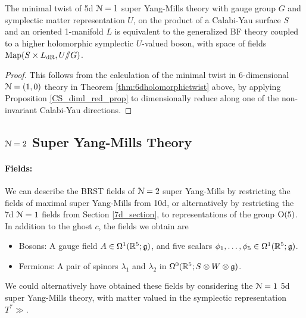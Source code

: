 \documentclass[10pt, oneside]{article}
\newcommand{\ham}{/\!\!/}
\begin{document}
\begin{theorem} \label{5d_holo_twist_theorem}
The minimal twist of 5d $\mathcal{N}=1$ super Yang-Mills theory with gauge group $G$ and symplectic matter representation $U$, on the product of a Calabi-Yau surface $S$ and an oriented 1-manifold $L$ is equivalent to the generalized BF theory coupled to a higher holomorphic symplectic $U$-valued boson, with space of fields $\mr{Map}(S \times L_{\mr{dR}}, U\ham G)$.
\end{theorem}

\begin{proof}
This follows from the calculation of the minimal twist in 6-dimensional $\mathcal{N}=(1,0)$ theory in Theorem \ref{thm:6dholomorphictwist} above, by applying Proposition \ref{CS_diml_red_prop} to dimensionally reduce along one of the non-invariant Calabi-Yau directions.
\end{proof}

\subsection{\texorpdfstring{$\mathcal{N} = 2$}{N=2} Super Yang-Mills Theory} \label{5d_2_section}

\paragraph{Fields:} We can describe the BRST fields of $\mathcal{N}=2$ super Yang-Mills by restricting the fields of maximal super Yang-Mills from 10d, or alternatively by restricting the 7d $\mathcal{N}=1$ fields from Section \ref{7d_section}, to representations of the group $\mathrm{O}(5)$.  In addition to the ghost $c$, the fields we obtain are
\begin{itemize}
 \item Bosons: A gauge field $A \in \Omega^1(\mathbb R^5; \mathfrak{g})$, and five scalars $\phi_1 ,\ldots, \phi_5 \in \Omega^1(\mathbb R^5; \mathfrak{g})$.
 \item Fermions: A pair of spinors $\lambda_1$ and $\lambda_2$ in $\Omega^0(\mathbb R^5; S \otimes W \otimes \mathfrak{g})$.
\end{itemize}
We could alternatively have obtained these fields by considering the $\mathcal{N}=1$ 5d super Yang-Mills theory, with matter valued in the symplectic representation $T^*\gg$.

\vspace{-10pt}
\end{document}
